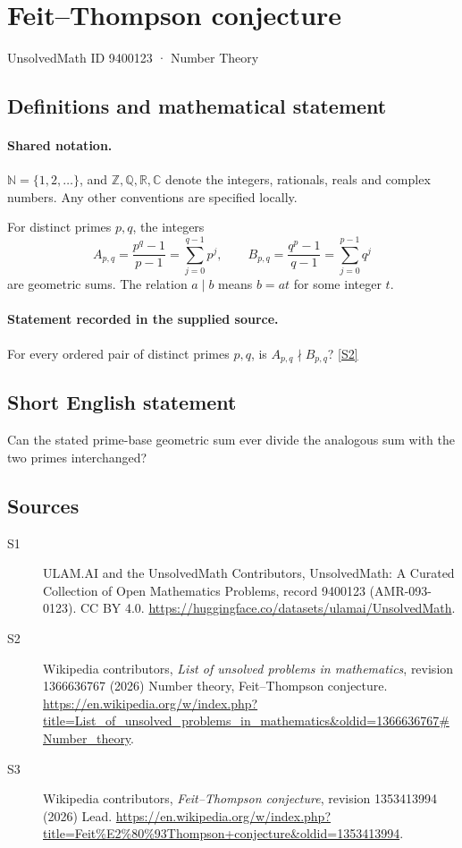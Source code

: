 \documentclass[11pt]{article}
\newcommand{\sref}[2]{\hyperlink{source:#1:#2}{[S#2]}}
\begin{document}
\setcounter{section}{9400122}
\section{Feit–Thompson conjecture}\label{9400123}
{\small\sffamily UnsolvedMath ID 9400123 · Number Theory}
\subsection{Definitions and mathematical statement}

\paragraph{Shared notation.}$\mathbb N=\{1,2,\ldots\}$, and $\mathbb Z,\mathbb Q,\mathbb R,\mathbb C$ denote the integers, rationals, reals and complex numbers. Any other conventions are specified locally.


For distinct primes $p,q$, the integers
\[
A_{p,q}=\frac{p^q-1}{p-1}=\sum_{j=0}^{q-1}p^j,\qquad B_{p,q}=\frac{q^p-1}{q-1}=\sum_{j=0}^{p-1}q^j
\]
are geometric sums. The relation $a\mid b$ means $b=at$ for some integer $t$.
\paragraph{Statement recorded in the supplied source.}
For every ordered pair of distinct primes $p,q$, is $A_{p,q}\nmid B_{p,q}$? \sref{9400123}{2}
\subsection{Short English statement}
Can the stated prime-base geometric sum ever divide the analogous sum with the two primes interchanged?
\subsection{Sources}
\begin{description}
\item[\hypertarget{source:9400123:1}{S1}] ULAM.AI and the UnsolvedMath Contributors, UnsolvedMath: A Curated Collection of Open Mathematics Problems, record 9400123 (AMR-093-0123). CC BY 4.0. \url{https://huggingface.co/datasets/ulamai/UnsolvedMath}.
\item[\hypertarget{source:9400123:2}{S2}] Wikipedia contributors, \emph{List of unsolved problems in mathematics}, revision 1366636767 (2026) Number theory, Feit–Thompson conjecture. \url{https://en.wikipedia.org/w/index.php?title=List_of_unsolved_problems_in_mathematics&oldid=1366636767#Number_theory}.
\item[\hypertarget{source:9400123:3}{S3}] Wikipedia contributors, \emph{Feit–Thompson conjecture}, revision 1353413994 (2026) Lead. \url{https://en.wikipedia.org/w/index.php?title=Feit%E2%80%93Thompson+conjecture&oldid=1353413994}.
\end{description}
\label{end:9400123}
\end{document}
